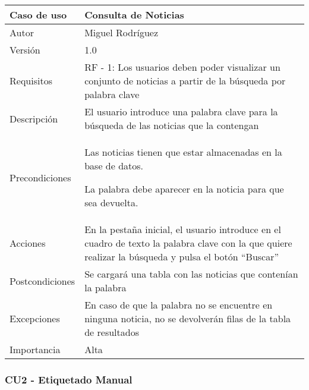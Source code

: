 \begin{center}
\begin{tabular}{ | m{3cm} | m{10cm}| } 
\hline
Caso de uso & Consulta de Noticias \\ 
\hline
Autor & Miguel Rodríguez \\ 
\hline
Versión & 1.0 \\ 
\hline
Requisitos & RF - 1: Los usuarios deben poder visualizar un conjunto de noticias a partir de la búsqueda por palabra clave \\ 
\hline
Descripción & El usuario introduce una palabra clave para la búsqueda de las noticias que la contengan \\
\hline
Precondiciones & Las noticias tienen que estar almacenadas en la base de datos. 

La palabra debe aparecer en la noticia para que sea devuelta. \\
\hline
Acciones & En la pestaña inicial, el usuario introduce en el cuadro de texto la palabra clave con la que quiere realizar la búsqueda y pulsa el botón ``Buscar'' \\
\hline
Postcondiciones & Se cargará una tabla con las noticias que contenían la palabra \\
\hline
Excepciones & En caso de que la palabra no se encuentre en ninguna noticia, no se devolverán filas de la tabla de resultados \\
\hline 
Importancia & Alta \\
\hline 
\end{tabular}
\end{center}
\clearpage
\subsubsection{CU2 - Etiquetado Manual}

